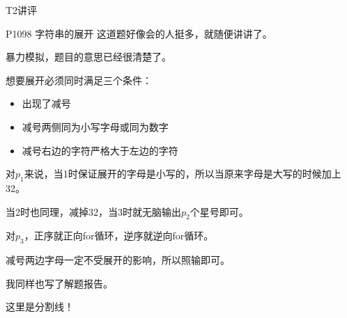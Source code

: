\documentclass[UTF-8]{beamer}
\begin{document}
\begin{section}{T2讲评}
\begin{frame}{P1098 字符串的展开}
    \pause
    这道题好像会的人挺多，就随便讲讲了。\pause

    暴力模拟，题目的意思已经很清楚了。\pause

    想要展开必须同时满足三个条件：\pause

    \begin{itemize}
      \item 出现了减号
      \item 减号两侧同为小写字母或同为数字
      \item 减号右边的字符严格大于左边的字符
    \end{itemize}
    \pause
    对$p_1$来说，当1时保证展开的字母是小写的，所以当原来字母是大写的时候\textcolor[rgb]{1.00,0.00,0.00}{加上32}。\pause

    当2时也同理，\textcolor[rgb]{1.00,0.00,0.00}{减掉32}，当3时就无脑输出$p_2$个星号即可。\pause

    对$p_3$，正序就正向for循环，逆序就逆向for循环。\pause

    减号两边字母一定不受展开的影响，所以照输即可。\pause

    我同样也写了解题报告。
\end{frame}
\end{section}

\begin{frame}
\pause
\begin{center}
\huge{这里是分割线！}
\end{center}
\end{frame}
\end{document}
